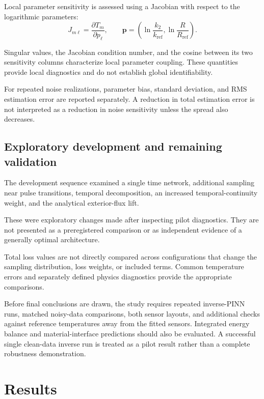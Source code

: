 \documentclass[11pt,a4paper]{article}
\begin{document}
Local parameter sensitivity is assessed using a Jacobian
with respect to the logarithmic parameters:
\begin{equation}
J_{m\ell}
=
\frac{\partial T_m}{\partial p_\ell},
\qquad
\boldsymbol{p}
=
\left(
\ln\frac{k_2}{k_{\mathrm{ref}}},
\ln\frac{R}{R_{\mathrm{ref}}}
\right).
\end{equation}

Singular values, the Jacobian condition number, and the cosine
between its two sensitivity columns characterize local
parameter coupling.
These quantities provide local diagnostics and do not
establish global identifiability.

For repeated noise realizations, parameter bias, standard
deviation, and RMS estimation error are reported separately.
A reduction in total estimation error is not interpreted as
a reduction in noise sensitivity unless the spread also
decreases.

\subsection{Exploratory development and remaining validation}

The development sequence examined a single time network,
additional sampling near pulse transitions, temporal
decomposition, an increased temporal-continuity weight,
and the analytical exterior-flux lift.

These were exploratory changes made after inspecting pilot
diagnostics. They are not presented as a preregistered
comparison or as independent evidence of a generally optimal
architecture.

Total loss values are not directly compared across
configurations that change the sampling distribution,
loss weights, or included terms.
Common temperature errors and separately defined physics
diagnostics provide the appropriate comparisons.

Before final conclusions are drawn, the study requires
repeated inverse-PINN runs, matched noisy-data comparisons,
both sensor layouts, and additional checks against reference
temperatures away from the fitted sensors.
Integrated energy balance and material-interface predictions
should also be evaluated.
A successful single clean-data inverse run is treated as a
pilot result rather than a complete robustness demonstration.

\section{Results}
\end{document}
